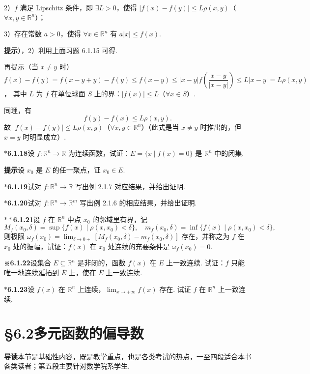 \documentclass[UTF8, 12pt, fontset=fandol, oneside]{ctexart}
\begin{document}
2）$f$ 满足 Lipschitz 条件，即 $\exists L>0$，使得 $|f(x)-f(y)|\le L\rho(x,y)$（$\forall x,y\in\mathbb{R}^n$）；

3）存在常数 $a>0$，使得 $\forall x\in\mathbb{R}^n$ 有 $a|x|\le f(x)$.

\noindent\textbf{提示}），2）利用上面习题 6.1.15 可得.

再提示\quad （当 $x\ne y$ 时）$f(x)-f(y)=f(x-y+y)-f(y)\le f(x-y)\le |x-y|f\left(\dfrac{x-y}{|x-y|}\right)\le L|x-y|=L\rho(x,y)$，
其中 $L$ 为 $f$ 在单位球面 $S$ 上的界：$|f(x)|\le L$（$\forall x\in S$）.

同理，有
\[
  f(y)-f(x)\le L\rho(x,y).
\]
故 $|f(x)-f(y)|\le L\rho(x,y)$（$\forall x,y\in\mathbb{R}^n$）（此式是当 $x\ne y$ 时推出的，但 $x=y$ 时明显成立）.

\noindent\textbf{$\ast$6.1.18}\quad 设 $f:\mathbb{R}^n\to\mathbb{R}$ 为连续函数，试证：$E=\{x\mid f(x)=0\}$ 是 $\mathbb{R}^n$ 中的闭集.

\noindent\textbf{提示}\quad 设 $x_0$ 是 $E$ 的任一聚点，证 $x_0\in E$.

\noindent\textbf{$\ast$6.1.19}\quad 试对 $f:\mathbb{R}^n\to\mathbb{R}$ 写出例 2.1.7 对应结果，并给出证明.

\noindent\textbf{$\ast$6.1.20}\quad 试对 $f:\mathbb{R}^n\to\mathbb{R}^m$ 写出例 2.1.6 的相应结果，并给出证明.

\noindent\textbf{$\ast\ast$6.1.21}\quad 设 $f$ 在 $\mathbb{R}^n$ 中点 $x_0$ 的邻域里有界，记
\[
  M_f(x_0,\delta)=\sup\{f(x)\mid \rho(x,x_0)<\delta\},\quad
  m_f(x_0,\delta)=\inf\{f(x)\mid \rho(x,x_0)<\delta\},
\]
则极限 $\omega_f(x_0)=\lim_{\delta\to0+}[M_f(x_0,\delta)-m_f(x_0,\delta)]$ 存在，并称之为 $f$ 在 $x_0$ 处的振幅，试证：$f(x)$ 在 $x_0$ 处连续的充要条件是 $\omega_f(x_0)=0$.

\noindent\textbf{※6.1.22}\quad 设集合 $E\subseteq\mathbb{R}^n$ 是非闭的，函数 $f(x)$ 在 $E$ 上一致连续. 试证：$f$ 只能唯一地连续延拓到 $\overline E$ 上，使在 $\overline E$ 上一致连续.

\noindent\textbf{$\ast$6.1.23}\quad 设 $f(x)$ 在 $\mathbb{R}^n$ 上连续，$\lim_{x\to+\infty}f(x)$ 存在. 试证 $f$ 在 $\mathbb{R}^n$ 上一致连续.

\section*{§6.2\quad 多元函数的偏导数}

\noindent\textbf{导读}\quad 本节是基础性内容，既是教学重点，也是各类考试的热点，一至四段适合本书各类读者；第五段主要针对数学院系学生.
\end{document}
